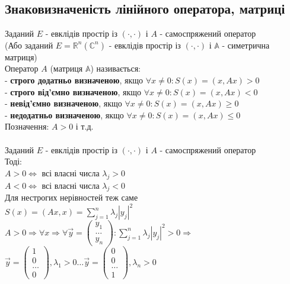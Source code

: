 \documentclass[a4paper, 10pt]{article}
\theoremstyle{theoremdd}
\begin{document}
\subsection{Знаковизначеність лінійного оператора, матриці}
Заданий $E$ - евклідів простір із $(\cdot,\cdot)$ і $A$ - самоспряжений оператор\\
(Або заданий $E = \mathbb{R}^n (\mathbb{C}^n)$ - евклідів простір із $(\cdot,\cdot)$ і $\mathbb{A}$ - симетрична матриця)\\
 Оператор $A$ (матриця $\mathbb{A}$) називається:\\
- \textbf{строго додатньо визначеною}, якщо $\forall x \neq 0: S(x) = (x,Ax) > 0$\\
- \textbf{строго від'ємно визначеною}, якщо $\forall x \neq 0: S(x) = (x,Ax) < 0$\\
- \textbf{невід'ємно визначеною}, якщо $\forall x \neq 0: S(x) = (x,Ax) \geq 0$\\
- \textbf{недодатньо визначеною}, якщо $\forall x \neq 0: S(x) = (x,Ax) \leq 0$\\
Позначення: $A > 0$ і т.д.
\bigskip \\
\\
Заданий $E$ - евклідів простір із $(\cdot,\cdot)$ і $A$ - самоспряжений оператор\\
Тоді:\\
$A > 0 \iff$ всі власні числа $\lambda_j > 0$\\
$A < 0 \iff$ всі власні числа $\lambda_j < 0$\\
Для нестрогих нерівностей теж саме\\
\proof
$S(x) = (Ax,x) = \displaystyle \sum_{j=1}^n \lambda_j |y_j|^2$\\
$A > 0 \Rightarrow \forall x \Rightarrow \forall \vec{y} = \begin{pmatrix}
y_1 \\ \dots \\ y_n
\end{pmatrix}: \displaystyle \sum_{j=1}^n \lambda_j |y_j|^2 > 0 \Rightarrow$\\
$\vec{y} = \begin{pmatrix}
1 \\ 0 \\ \dots \\ 0
\end{pmatrix}, \lambda_1 > 0 \dots \vec{y} = \begin{pmatrix}
0 \\ 0 \\ \dots \\ 1
\end{pmatrix}, \lambda_n > 0$\\
\end{document}

